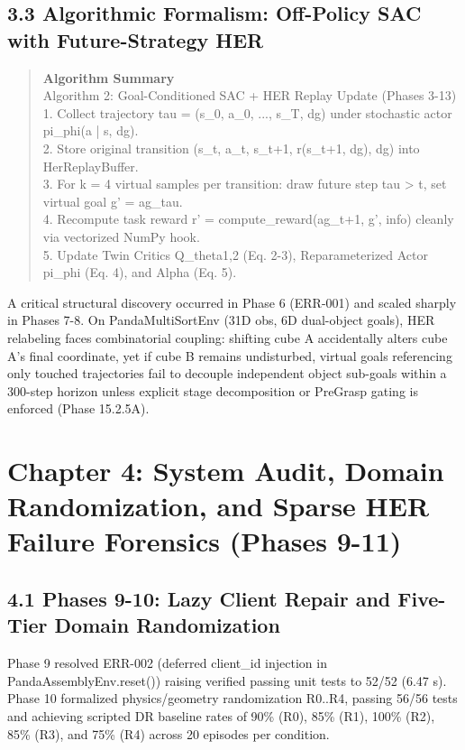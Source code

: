 \documentclass[11pt,a4paper,oneside]{book}
\begin{document}
\section{3.3 Algorithmic Formalism: Off-Policy SAC with Future-Strategy HER}
\begin{quote}\small\textbf{Algorithm Summary}\\Algorithm 2: Goal-Conditioned SAC + HER Replay Update (Phases 3-13) \\ 1. Collect trajectory tau = (s\_0, a\_0, ..., s\_T, dg) under stochastic actor pi\_phi(a | s, dg). \\ 2. Store original transition (s\_t, a\_t, s\_{t+1}, r(s\_{t+1}, dg), dg) into HerReplayBuffer. \\ 3. For k = 4 virtual samples per transition: draw future step tau > t, set virtual goal g' = ag\_tau. \\ 4. Recompute task reward r' = compute\_reward(ag\_{t+1}, g', info) cleanly via vectorized NumPy hook. \\ 5. Update Twin Critics Q\_theta1,2 (Eq. 2-3), Reparameterized Actor pi\_phi (Eq. 4), and Alpha (Eq. 5).\end{quote}

A critical structural discovery occurred in Phase 6 (ERR-001) and scaled sharply in Phases 7-8. On PandaMultiSortEnv (31D obs, 6D dual-object goals), HER relabeling faces combinatorial coupling: shifting cube A accidentally alters cube A's final coordinate, yet if cube B remains undisturbed, virtual goals referencing only touched trajectories fail to decouple independent object sub-goals within a 300-step horizon unless explicit stage decomposition or PreGrasp gating is enforced (Phase 15.2.5A).

\chapter{Chapter 4: System Audit, Domain Randomization, and Sparse HER Failure Forensics (Phases 9-11)}
\section{4.1 Phases 9-10: Lazy Client Repair and Five-Tier Domain Randomization}
Phase 9 resolved ERR-002 (deferred client\_id injection in PandaAssemblyEnv.reset()) raising verified passing unit tests to 52/52 (6.47 s). Phase 10 formalized physics/geometry randomization R0..R4, passing 56/56 tests and achieving scripted DR baseline rates of 90\% (R0), 85\% (R1), 100\% (R2), 85\% (R3), and 75\% (R4) across 20 episodes per condition.
\end{document}
